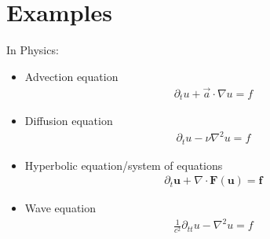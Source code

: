 \documentclass[letterpaper,10pt,english]{jupyterBook}
\begin{document}
\section{Examples}
\label{\detokenize{ch/pde/intro:examples}}\label{\detokenize{ch/pde/intro:pde-examples}}
\sphinxAtStartPar
In Physics:
\begin{itemize}
\item {} 
\sphinxAtStartPar
Advection equation
\begin{equation*}
\begin{split}\partial_t u + \vec{a} \cdot \nabla u = f\end{split}
\end{equation*}
\item {} 
\sphinxAtStartPar
Diffusion equation
\begin{equation*}
\begin{split}\partial_t u - \nu \nabla^2 u = f\end{split}
\end{equation*}
\item {} 
\sphinxAtStartPar
Hyperbolic equation/system of equations
\begin{equation*}
\begin{split}\partial_t \mathbf{u} + \nabla \cdot \mathbf{F}(\mathbf{u}) = \mathbf{f} \end{split}
\end{equation*}
\item {} 
\sphinxAtStartPar
Wave equation
\begin{equation*}
\begin{split}\frac{1}{c^2} \partial_{tt} u - \nabla^2 u = f\end{split}
\end{equation*}
\end{itemize}
\end{document}
